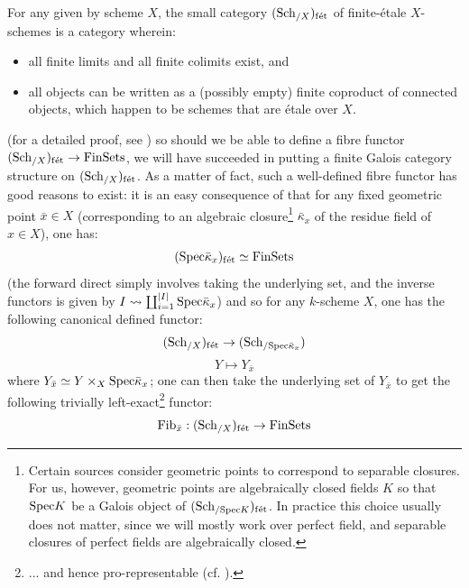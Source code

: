                 \begin{remark} \label{remark: finite_etale_schemes}
                    For any given by scheme $X$, the small category $(\mathrm{Sch}_{/X})_{\mathrm{f\acute{e}t}}$ of finite-\'etale $X$-schemes is a category wherein:
                        \begin{itemize}
                            \item all finite limits and all finite colimits exist, and
                            \item all objects can be written as a (possibly empty) finite coproduct of connected objects, which happen to be schemes that are \'etale over $X$.  
                        \end{itemize}
                    (for a detailed proof, see \cite[\href{https://stacks.math.columbia.edu/tag/0BN9}{Tag 0BN9}]{stacks}) so should we be able to define a fibre functor $(\mathrm{Sch}_{/X})_{\mathrm{f\acute{e}t}} \to \mathrm{Fin}\mathrm{Sets}$, we will have succeeded in putting a finite Galois category structure on $(\mathrm{Sch}_{/X})_{\mathrm{f\acute{e}t}}$. As a matter of fact, such a well-defined fibre functor has good reasons to exist: it is an easy consequence of \cite[\href{https://stacks.math.columbia.edu/tag/00U3}{Tag 00U3}]{stacks} that for any fixed geometric point $\bar{x} \in X$ (corresponding to an algebraic closure\footnote{Certain sources consider geometric points to correspond to separable closures. For us, however, geometric points are algebraically closed fields $K$ so that $\mathrm{Spec} K$ be a Galois object of $(\mathrm{Sch}_{/\mathrm{Spec} K})_{\mathrm{f\acute{e}t}}$. In practice this choice usually does not matter, since we will mostly work over perfect field, and separable closures of perfect fields are algebraically closed.} $\bar{\kappa}_x$ of the residue field of $x \in X$), one has:
                        $$(\mathrm{Spec} \bar{\kappa}_x)_{\mathrm{f\acute{e}t}} \simeq \mathrm{Fin}\mathrm{Sets}$$
                    (the forward direct simply involves taking the underlying set, and the inverse functors is given by $I \leadsto \coprod_{i = 1}^{|I|} \mathrm{Spec} \bar{\kappa}_x$) and so for any $k$-scheme $X$, one has the following canonical defined functor:
                        $$(\mathrm{Sch}_{/X})_{\mathrm{f\acute{e}t}} \to (\mathrm{Sch}_{/\mathrm{Spec} \bar{\kappa}_x})$$
                        $$Y \mapsto Y_{\bar{x}}$$
                    where $Y_{\bar{x}} \cong Y \x_X \Spec \bar{\kappa}_x$; one can then take the underlying set of $Y_{\bar{x}}$ to get the following trivially left-exact\footnote{... and hence pro-representable (cf. \cite[Proposition 3.1]{grothendieck_fga_2}).} functor:
                        $$\mathrm{Fib}_{\bar{x}}: (\mathrm{Sch}_{/X})_{\mathrm{f\acute{e}t}} \to \mathrm{Fin}\mathrm{Sets}$$

\end{remark}
